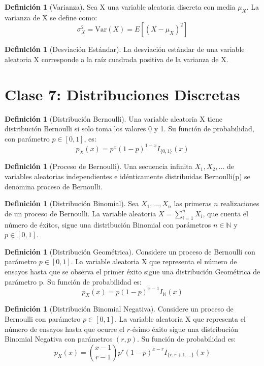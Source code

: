 \documentclass[11pt]{article}
\theoremstyle{definition} %
\newtheorem{definition}[theorem]{Definición}
\begin{document}
\begin{definition}[Varianza]
Sea X una variable aleatoria discreta con media $\mu_X$. La varianza de X se define como:
$$ \sigma_{X}^{2} = \text{Var}(X) = E[(X - \mu_{X})^{2}] $$
\end{definition}

\begin{definition}[Desviación Estándar]
La desviación estándar de una variable aleatoria X corresponde a la raíz cuadrada positiva de la varianza de X.
\end{definition}


\section{Clase 7: Distribuciones Discretas}

\begin{definition}[Distribución Bernoulli]
Una variable aleatoria X tiene distribución Bernoulli si solo toma los valores 0 y 1. Su función de probabilidad, con parámetro $p \in [0,1]$, es:
$$ p_{X}(x) = p^{x}(1-p)^{1-x} I_{\{0,1\}}(x) $$
\end{definition}

\begin{definition}[Proceso de Bernoulli]
Una secuencia infinita $X_{1}, X_{2}, \dots$ de variables aleatorias independientes e idénticamente distribuidas Bernoulli(p) se denomina proceso de Bernoulli.
\end{definition}

\begin{definition}[Distribución Binomial]
Sea $X_{1}, \dots, X_{n}$ las primeras $n$ realizaciones de un proceso de Bernoulli. La variable aleatoria $X = \sum_{i=1}^{n} X_{i}$, que cuenta el número de éxitos, sigue una distribución Binomial con parámetros $n \in \mathbb{N}$ y $p \in [0,1]$.
\end{definition}

\begin{definition}[Distribución Geométrica]
Considere un proceso de Bernoulli con parámetro $p \in [0,1]$. La variable aleatoria X que representa el número de ensayos hasta que se observa el primer éxito sigue una distribución Geométrica de parámetro p. Su función de probabilidad es:
$$ p_{X}(x) = p(1-p)^{x-1} I_{\mathbb{N}}(x) $$
\end{definition}

\begin{definition}[Distribución Binomial Negativa]
Considere un proceso de Bernoulli con parámetro $p \in [0,1]$. La variable aleatoria X que representa el número de ensayos hasta que ocurre el $r$-ésimo éxito sigue una distribución Binomial Negativa con parámetros $(r,p)$. Su función de probabilidad es:
$$ p_{X}(x) = \binom{x-1}{r-1} p^{r}(1-p)^{x-r} I_{\{r, r+1, \dots\}}(x) $$
\end{definition}
\end{document}
